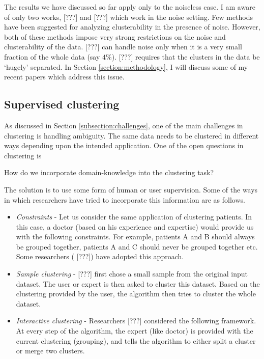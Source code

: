 \documentclass[11pt]{article}
\begin{document}
The results we have discussed so far apply only to the noiseless case. I am aware of only two works, {\color{red} [???]\cite{balcan2012clustering}} and {\color{red} [???]\cite{ben2014clustering}} which work in the noise setting. Few methods have been suggested for analyzing clusterability in the presence of noise. However, both of these methods impose very strong restrictions on the noise and clusterability of the data. {\color{red} [???]\cite{balcan2012clustering}} can handle noise only when it is a very small fraction of the whole data (say $4\%$). {\color{red} [???]\cite{ben2014clustering}} requires that the clusters in the data be `hugely' separated. In Section \ref{section:methodology}, I will discuss some of my recent papers which address this issue.

\subsection{Supervised clustering}
\label{subsection:supervisedclustering}
As discussed in Section \ref{subsection:challenges}, one of the main challenges in clustering is handling ambiguity. The same data needs to be clustered in different ways depending upon the intended application. One of the open questions in clustering is 
\begin{center}
How do we incorporate domain-knowledge into the clustering task?
\end{center}

The solution is to use some form of human or user supervision. Some of the ways in which researchers have tried to incorporate this information are as follows.
\begin{itemize}[nolistsep]
\item {\em Constraints} -  Let us consider the same application of clustering patients. In this case, a doctor (based on his experience and expertise) would provide us with the following constraints. For example, patients A and B should always be grouped together, patients A and C should never be grouped together etc. Some researchers  ({\color{red} [???]\cite{basu2002semi,basu2004probabilistic, kulis2009semi}}) have adopted this approach.
\item {\em Sample clustering} - {\color{red} [???]\cite{ashtiani2015representation}} first chose a small sample from the original input dataset. The user or expert is then asked to cluster this dataset. Based on the clustering provided by the user, the algorithm then tries to cluster the whole dataset. 
\item {\em Interactive clustering} - Researchers {\color{red} [???]\cite{balcan2008clustering}} considered the following framework. At every step of the algorithm, the expert (like doctor) is provided with the current clustering (grouping), and tells the algorithm to either split a cluster or merge two clusters.
\end{itemize}
\end{document}

